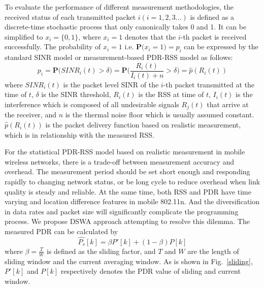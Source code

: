 \documentclass[draftclsnofoot,journal,onecolumn,11pt]{IEEEtran}
\begin{document}
To evaluate the performance of different measurement methodologies, the received status of each transmitted packet $i(i=1,2,3...)$ is defined as a discrete-time stochastic process that only canonically takes 0 and 1. It can be simplified to $x_i=\{0,1\}$, where $x_i=1$ denotes that the $i$-th packet is received successfully. The probability of $x_i=1$ i.e. $\textbf{P(}x_i=1\textbf{)}=p_i$ can be expressed by the standard SINR model or measurement-based PDR-RSS model as follows:
\begin{equation}
 p_i=\textbf{P(}SINR_i(t)>\delta\textbf{)}=\textbf{P(}\frac{R_i(t)}{I_i(t)+n}>\delta\textbf{)}=\hat{p}(R_i(t))
\label{p_i}
\end{equation}
where $SINR_i(t)$ is the packet level SINR of the $i$-th packet transmitted at the time of $t$, $\delta$ is the SINR threshold, $R_i(t)$ is the RSS at time of $t$, $I_i(t)$ is the interference which is composed of all undesirable signals $R_j(t)$ that arrive at the receiver, and $n$ is the thermal noise floor which is usually assumed constant. $\hat{p}(R_i(t))$ is the packet delivery function based on realistic measurement, which is in relationship with the measured RSS.

For the statistical PDR-RSS model based on realistic measurement in mobile wireless networks, there is a trade-off between measurement accuracy and overhead. The measurement period should be set short enough and responding rapidly to changing network status, or be long cycle to reduce overhead when link quality is steady and reliable. At the same time, both RSS and PDR have time varying and location difference features in mobile 802.11n. And the diversification in data rates and packet size will significantly complicate the programming process. We propose DSWA approach attempting to resolve this dilemma. The measured PDR can be calculated by
\begin{equation}
 \hat{P_s}[k]=\beta P'[k]+(1-\beta)P[k]
 \label{P_s}
\end{equation}
where $\beta=\frac{T}{W}$ is defined as the sliding factor, and $T$ and $W$ are the length of sliding window and the current averaging window. As is shown in Fig.~\ref{sliding}, $P'[k]$ and $P[k]$ respectively denotes the PDR value of sliding and current window.
\end{document}
